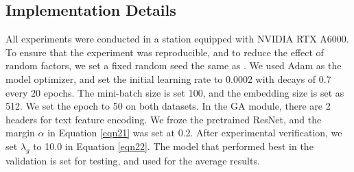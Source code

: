 \documentclass[journal]{IEEEtran}
\begin{document}
\subsection{Implementation Details}
All experiments were conducted in a station equipped with NVIDIA RTX A6000. To ensure that the experiment was reproducible, and to reduce the effect of random factors, we set a fixed random seed the same as \cite{rao2022does}. We used Adam \cite{kingma2014adam} as the model optimizer, and set the initial learning rate to 0.0002 with decays of 0.7 every 20 epochs. The mini-batch size is set 100, and the embedding size is set as 512. We set the epoch to 50 on both datasets. In the GA module, there are 2 headers for text feature encoding. We froze the pretrained ResNet, and the margin $\alpha$ in Equation \ref{eqn21} was set at 0.2. After experimental verification, we set $\lambda_g$ to 10.0 in Equation \ref{eqn22}. The model that performed best in the validation is set for testing, and used for the average results.
\end{document}
